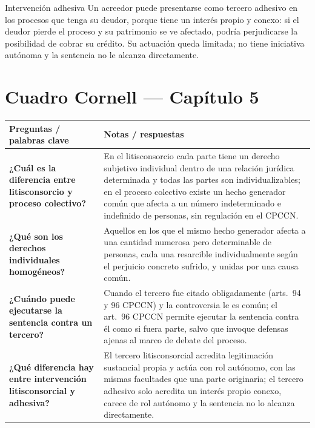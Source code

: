 \documentclass[12pt,oneside]{book}
\begin{document}
\begin{example}{Intervención adhesiva}
Un acreedor puede presentarse como tercero adhesivo en los procesos que tenga su deudor, porque tiene un interés propio y conexo: si el deudor pierde el proceso y su patrimonio se ve afectado, podría perjudicarse la posibilidad de cobrar su crédito. Su actuación queda limitada; no tiene iniciativa autónoma y la sentencia no le alcanza directamente.
\end{example}

\section*{Cuadro Cornell --- Capítulo 5}

\begin{table}[H]
\centering
\begin{tabularx}{\textwidth}{
    >{\raggedright\arraybackslash}p{}
    >{\raggedright\arraybackslash}X
}
\toprule
\textbf{Preguntas / palabras clave} & \textbf{Notas / respuestas} \\
\midrule

\textbf{¿Cuál es la diferencia entre litisconsorcio y proceso colectivo?} &
En el litisconsorcio cada parte tiene un derecho subjetivo individual dentro de una relación jurídica determinada y todas las partes son individualizables; en el proceso colectivo existe un hecho generador común que afecta a un número indeterminado e indefinido de personas, sin regulación en el CPCCN. \\

\textbf{¿Qué son los derechos individuales homogéneos?} &
Aquellos en los que el mismo hecho generador afecta a una cantidad numerosa pero determinable de personas, cada una resarcible individualmente según el perjuicio concreto sufrido, y unidas por una causa común. \\

\textbf{¿Cuándo puede ejecutarse la sentencia contra un tercero?} &
Cuando el tercero fue citado obligadamente (arts.\ 94 y 96 CPCCN) y la controversia le es común; el art.\ 96 CPCCN permite ejecutar la sentencia contra él como si fuera parte, salvo que invoque defensas ajenas al marco de debate del proceso. \\

\textbf{¿Qué diferencia hay entre intervención litisconsorcial y adhesiva?} &
El tercero litisconsorcial acredita legitimación sustancial propia y actúa con rol autónomo, con las mismas facultades que una parte originaria; el tercero adhesivo solo acredita un interés propio conexo, carece de rol autónomo y la sentencia no lo alcanza directamente. \\


\end{tabularx}
\end{table}
\end{document}
